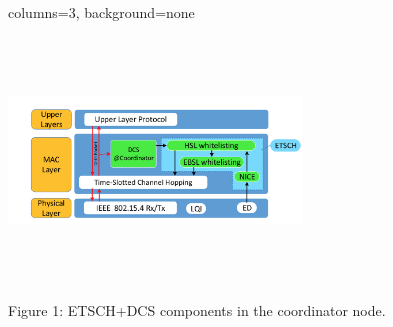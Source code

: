 \documentclass[portrait,paperwidth=91cm,paperheight=121cm,fontscale=0.35]{baposter} %
\begin{document}
\begin{poster}{columns=3, background=none}
{   \begin{minipage}[mac]{0.65\linewidth}            
    \begin{minipage}[mac]{0.55\linewidth}
                    \centering
                    \includegraphics[height=6.5cm,width=7.8cm,scale=.30]{mac.png}
                    
                    \caption{Figure 1: ETSCH+DCS components in the coordinator node.}
                    \label{fig:macp}
              \end{minipage}
             \hspace{0.5cm}
              \begin{minipage}[white]{0.44\linewidth}
                    \centering
                    

\end{minipage}
\end{minipage}}
\end{poster}
\end{document}
